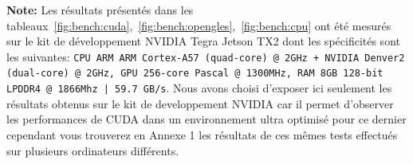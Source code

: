 \textbf{Note:} Les résultats présentés dans les tableaux~\ref{fig:bench:cuda},~\ref{fig:bench:opengles},~\ref{fig:bench:cpu} ont été mesurés sur le kit de développement NVIDIA Tegra Jetson TX2 dont les spécificités sont les suivantes: \texttt{CPU ARM ARM Cortex-A57 (quad-core) @ 2GHz + NVIDIA Denver2 (dual-core) @ 2GHz, GPU 256-core Pascal @ 1300MHz, RAM 8GB 128-bit LPDDR4 @ 1866Mhz |  59.7 GB/s}. Nous avons choisi d'exposer ici seulement les résultats obtenus sur le kit de developpement NVIDIA car il permet d'observer les performances de CUDA dans un environnement ultra optimisé pour ce dernier cependant vous trouverez en Annexe 1 les résultats de ces mêmes tests effectués sur plusieurs ordinateurs différents.

\begin{table}[H]
\centering
\caption{CUDA 9.0 - Convolution d'une image en niveau de gris par un filtre de taille 5x5 - float 32bits}
\label{fig:bench:cuda}
\end{table}

